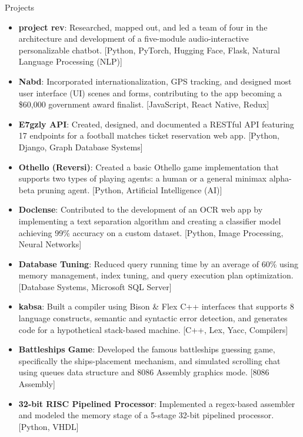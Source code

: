\documentclass[]{mcdowellcv}
\begin{document}
	\begin{cvsection}{Projects}
		\begin{cvsubsection}{}{}{}
			\begin{itemize}
				\item \textbf{project rev}: Researched, mapped out, and led a team of four in the architecture and development of a five-module audio-interactive personalizable chatbot. [Python, PyTorch, Hugging Face, Flask, Natural Language Processing (NLP)]
				\item \textbf{Nabd}: Incorporated internationalization, GPS tracking, and designed most user interface (UI) scenes and forms, contributing to the app becoming a \$60,000 government award finalist. [JavaScript, React Native, Redux]
				\item \textbf{E7gzly API}: Created, designed, and documented a RESTful API featuring 17 endpoints for a football matches ticket reservation web app. [Python, Django, Graph Database Systems]
				\item \textbf{Othello (Reversi)}: Created a basic Othello game implementation that supports two types of playing agents: a human or a general minimax alpha-beta pruning agent. [Python, Artificial Intelligence (AI)]
				\item \textbf{Doclense}: Contributed to the development of an OCR web app by implementing a text separation algorithm and creating a classifier model achieving 99\% accuracy on a custom dataset. [Python, Image Processing, Neural Networks]
				\item \textbf{Database Tuning}: Reduced query running time by an average of 60\% using memory management, index tuning, and query execution plan optimization. [Database Systems, Microsoft SQL Server]
				\item \textbf{kabsa}: Built a compiler using Bison \& Flex C++ interfaces that supports 8 language constructs, semantic and syntactic error detection, and generates code for a hypothetical stack-based machine. [C++, Lex, Yacc, Compilers]
				\item \textbf{Battleships Game}: Developed the famous battleships guessing game, specifically the ships-placement mechanism, and simulated scrolling chat using queues data structure and 8086 Assembly graphics mode. [8086 Assembly]
				\item \textbf{32-bit RISC Pipelined Processor}: Implemented a regex-based assembler and modeled the memory stage of a 5-stage 32-bit pipelined processor. [Python, VHDL]
			\end{itemize}
		\end{cvsubsection}
	\end{cvsection}
	
\end{document}
